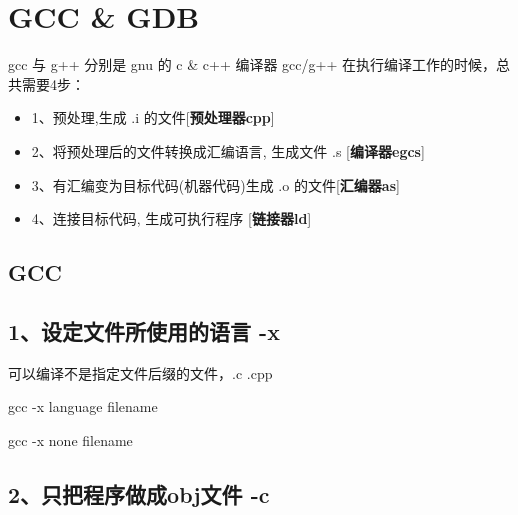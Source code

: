 \documentclass[
]{article}
\author{}
\date{}
\newenvironment{Shaded}{}{}
\newcommand{\NormalTok}[1]{#1}
\begin{document}
\hypertarget{gcc--gdb}{%
\section{GCC \& GDB}\label{gcc--gdb}}

gcc 与 g++ 分别是 gnu 的 c \& c++ 编译器 gcc/g++
在执行编译工作的时候，总共需要4步：

\begin{itemize}
\item
  1、预处理,生成 .i 的文件{[}\textbf{预处理器cpp}{]}
\item
  2、将预处理后的文件转换成汇编语言, 生成文件 .s
  {[}\textbf{编译器egcs}{]}
\item
  3、有汇编变为目标代码(机器代码)生成 .o 的文件{[}\textbf{汇编器as}{]}
\item
  4、连接目标代码, 生成可执行程序 {[}\textbf{链接器ld}{]}
\end{itemize}

\hypertarget{gcc}{%
\subsection{GCC}\label{gcc}}

\hypertarget{1ux8bbeux5b9aux6587ux4ef6ux6240ux4f7fux7528ux7684ux8bedux8a00--x}{%
\subsection{1、设定文件所使用的语言
-x}\label{1ux8bbeux5b9aux6587ux4ef6ux6240ux4f7fux7528ux7684ux8bedux8a00--x}}

可以编译不是指定文件后缀的文件，.c .cpp

\begin{Shaded}
\begin{Highlighting}[]
\NormalTok{gcc {-}x language filename}
\end{Highlighting}
\end{Shaded}

\begin{Shaded}
\begin{Highlighting}[]
\NormalTok{gcc {-}x none filename}
\end{Highlighting}
\end{Shaded}

\hypertarget{2ux53eaux628aux7a0bux5e8fux505aux6210objux6587ux4ef6--c}{%
\subsection{2、只把程序做成obj文件
-c}\label{2ux53eaux628aux7a0bux5e8fux505aux6210objux6587ux4ef6--c}}
\end{document}
